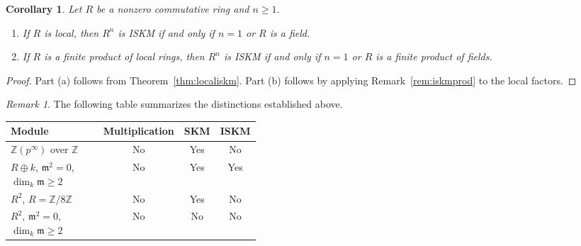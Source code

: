 \documentclass[11pt,a4paper]{article}
\newtheorem{proposition}[theorem]{Proposition}
\newtheorem{corollary}[theorem]{Corollary}
\theoremstyle{definition}
\theoremstyle{remark}
\newtheorem{remark}[theorem]{Remark}
\begin{document}

\begin{corollary}
\label{cor:free}
Let $R$ be a nonzero commutative ring and $n\geq1$.
\begin{enumerate}[label=\textup{(\alph*)}]
\item If $R$ is local, then $R^n$ is ISKM if and only if $n=1$ or $R$ is a field.
\item If $R$ is a finite product of local rings, then $R^n$ is ISKM if and only if $n=1$ or $R$ is a finite product of fields.
\end{enumerate}
\end{corollary}

\begin{proof}
Part (a) follows from Theorem~\ref{thm:localiskm}. Part (b) follows by applying Remark~\ref{rem:iskmprod} to the local factors.
\end{proof}

\begin{remark}
The following table summarizes the distinctions established above.

{\small
\begin{tabular}{@{}p{0.41\linewidth}ccc@{}}
\toprule
Module & Multiplication & SKM & ISKM\\
\midrule
$\mathbb Z(p^\infty)$ over $\mathbb Z$
& No & Yes & No\\
$R\oplus k$, $\mathfrak m^2=0$,
$\dim_k\mathfrak m\geq2$
& No & Yes & Yes\\
$R^2$, $R=\mathbb Z/8\mathbb Z$
& No & Yes & No\\
$R^2$, $\mathfrak m^2=0$,
$\dim_k\mathfrak m\geq2$
& No & No & No\\
\bottomrule
\end{tabular}
}
\end{remark}
\end{document}
